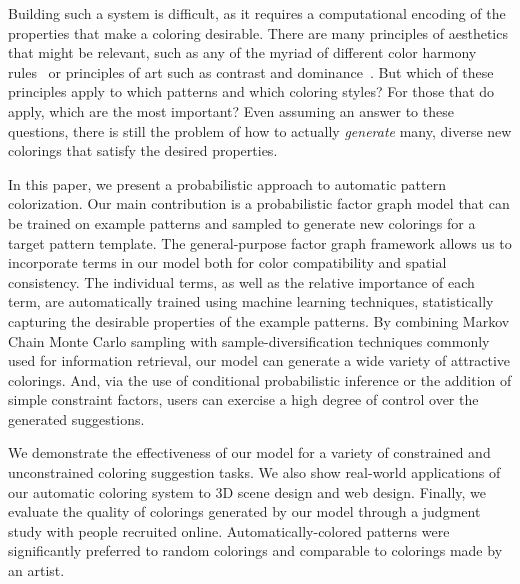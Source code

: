Building such a system is difficult, as it requires a computational encoding of the properties that make a coloring desirable. There are many principles of aesthetics that might be relevant, such as any of the myriad of different color harmony rules~\cite{ColorHarmonyBook} or principles of art such as contrast and dominance~\cite{ArtPrinciples}. But which of these principles apply to which patterns and which coloring styles? For those that do apply, which are the most important? Even assuming an answer to these questions, there is still the problem of how to actually \emph{generate} many, diverse new colorings that satisfy the desired properties.

In this paper, we present a probabilistic approach to automatic pattern colorization. Our main contribution is a probabilistic factor graph model that can be trained on example patterns and sampled to generate new colorings for a target pattern template. The general-purpose factor graph framework allows us to incorporate terms in our model both for color compatibility and spatial consistency. The individual terms, as well as the relative importance of each term, are automatically trained using machine learning techniques, statistically capturing the desirable properties of the example patterns. By combining Markov Chain Monte Carlo sampling with sample-diversification techniques commonly used for information retrieval, our model can generate a wide variety of attractive colorings. And, via the use of conditional probabilistic inference or the addition of simple constraint factors, users can exercise a high degree of control over the generated suggestions.

We demonstrate the effectiveness of our model for a variety of constrained and unconstrained coloring suggestion tasks. We also show real-world applications of our automatic coloring system to 3D scene design and web design. Finally, we evaluate the quality of colorings generated by our model through a judgment study with people recruited online. Automatically-colored patterns were significantly preferred to random colorings and comparable to colorings made by an artist.

